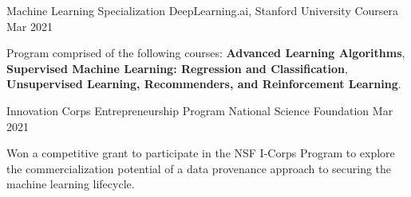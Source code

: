 

\begin{cventries}

  
    \cventry
    {Machine Learning Specialization} %
    {DeepLearning.ai, Stanford University} %
    {Coursera} %
    {Mar 2021} %
    {
      \begin{cvitems} %
        \item {Program comprised of the following courses: \textbf{Advanced Learning Algorithms}, \textbf{Supervised Machine Learning: Regression and Classification}, \textbf{Unsupervised Learning, Recommenders, and Reinforcement Learning}.}
      \end{cvitems}
    }
  
    
  \cventry
    {Innovation Corps Entrepreneurship Program} %
    {National Science Foundation} %
    {} %
    {Mar 2021} %
    {
      \begin{cvitems} %
        \item {Won a competitive grant to participate in the NSF I-Corps Program to explore the commercialization potential of a data provenance approach to securing the machine learning lifecycle.}
      \end{cvitems}
    }
    

\end{cventries}
